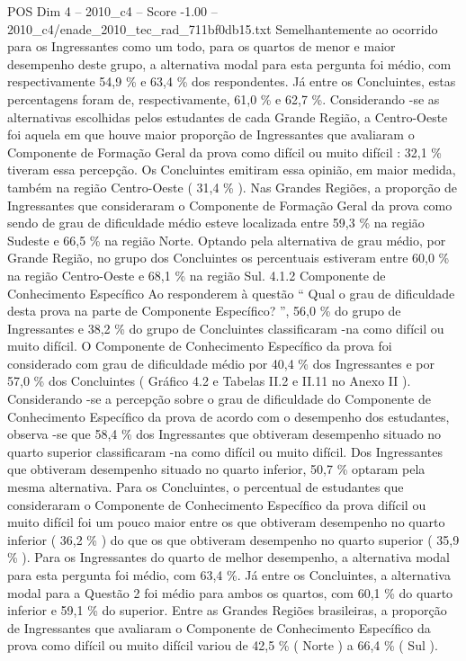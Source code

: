 \begin{textsample}{POS Dim 4 – 2010\_c4 – Score -1.00 – 2010\_c4/enade\_2010\_tec\_rad\_711bf0db15.txt}
Semelhantemente ao ocorrido para os Ingressantes como um todo, para os quartos de menor e maior desempenho deste grupo, a alternativa modal para esta pergunta foi médio, com respectivamente 54,9 \% e 63,4 \% dos respondentes.
Já entre os Concluintes, estas percentagens foram de, respectivamente, 61,0 \% e 62,7 \%.
Considerando -se as alternativas escolhidas pelos estudantes de cada Grande Região, a Centro-Oeste foi aquela em que houve maior proporção de Ingressantes que avaliaram o Componente de Formação Geral da prova como difícil ou muito difícil : 32,1 \% tiveram essa percepção.
Os Concluintes emitiram essa opinião, em maior medida, também na região Centro-Oeste ( 31,4 \% ).
Nas Grandes Regiões, a proporção de Ingressantes que consideraram o Componente de Formação Geral da prova como sendo de grau de dificuldade médio esteve localizada entre 59,3 \% na região Sudeste e 66,5 \% na região Norte.
Optando pela alternativa de grau médio, por Grande Região, no grupo dos Concluintes os percentuais estiveram entre 60,0 \% na região Centro-Oeste e 68,1 \% na região Sul. 4.1.2 Componente de Conhecimento Específico Ao responderem à questão “ Qual o grau de dificuldade desta prova na parte de Componente Específico? ”, 56,0 \% do grupo de Ingressantes e 38,2 \% do grupo de Concluintes classificaram -na como difícil ou muito difícil.
O Componente de Conhecimento Específico da prova foi considerado com grau de dificuldade médio por 40,4 \% dos Ingressantes e por 57,0 \% dos Concluintes ( Gráfico 4.2 e Tabelas II.2 e II.11 no Anexo II ).
Considerando -se a percepção sobre o grau de dificuldade do Componente de Conhecimento Específico da prova de acordo com o desempenho dos estudantes, observa -se que 58,4 \% dos Ingressantes que obtiveram desempenho situado no quarto superior classificaram -na como difícil ou muito difícil.
Dos Ingressantes que obtiveram desempenho situado no quarto inferior, 50,7 \% optaram pela mesma alternativa.
Para os Concluintes, o percentual de estudantes que consideraram o Componente de Conhecimento Específico da prova difícil ou muito difícil foi um pouco maior entre os que obtiveram desempenho no quarto inferior ( 36,2 \% ) do que os que obtiveram desempenho no quarto superior ( 35,9 \% ).
Para os Ingressantes do quarto de melhor desempenho, a alternativa modal para esta pergunta foi médio, com 63,4 \%.
Já entre os Concluintes, a alternativa modal para a Questão 2 foi médio para ambos os quartos, com 60,1 \% do quarto inferior e 59,1 \% do superior.
Entre as Grandes Regiões brasileiras, a proporção de Ingressantes que avaliaram o Componente de Conhecimento Específico da prova como difícil ou muito difícil variou de 42,5 \% ( Norte ) a 66,4 \% ( Sul ).

\end{textsample}
